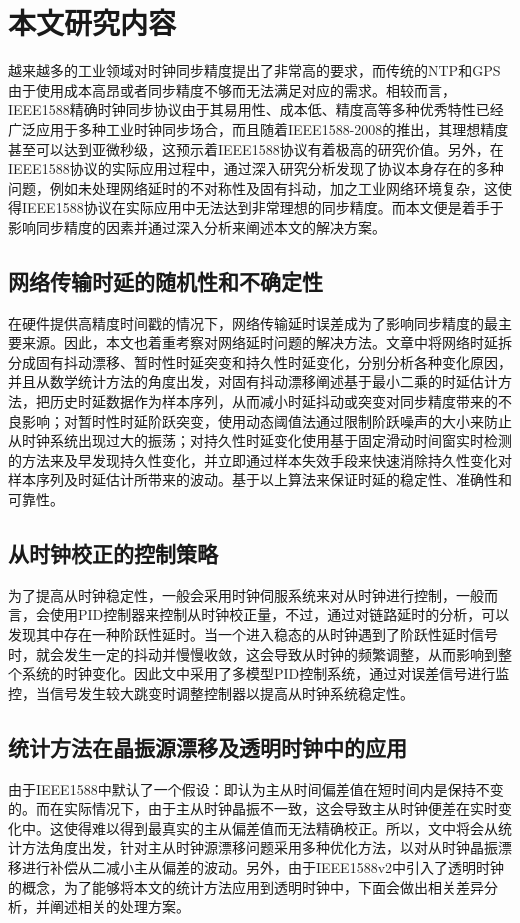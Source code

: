 \section{本文研究内容}
越来越多的工业领域对时钟同步精度提出了非常高的要求，而传统的NTP和GPS由于使用成本高昂或者同步精度不够而无法满足对应的需求。相较而言，IEEE1588精确时钟同步协议由于其易用性、成本低、精度高等多种优秀特性已经广泛应用于多种工业时钟同步场合，而且随着IEEE1588-2008的推出，其理想精度甚至可以达到亚微秒级，这预示着IEEE1588协议有着极高的研究价值。另外，在IEEE1588协议的实际应用过程中，通过深入研究分析发现了协议本身存在的多种问题，例如未处理网络延时的不对称性及固有抖动，加之工业网络环境复杂，这使得IEEE1588协议在实际应用中无法达到非常理想的同步精度。而本文便是着手于影响同步精度的因素并通过深入分析来阐述本文的解决方案。

\subsection{网络传输时延的随机性和不确定性}
在硬件提供高精度时间戳的情况下，网络传输延时误差成为了影响同步精度的最主要来源。因此，本文也着重考察对网络延时问题的解决方法。文章中将网络时延拆分成固有抖动漂移、暂时性时延突变和持久性时延变化，分别分析各种变化原因，并且从数学统计方法的角度出发，对固有抖动漂移阐述基于最小二乘的时延估计方法，把历史时延数据作为样本序列，从而减小时延抖动或突变对同步精度带来的不良影响；对暂时性时延阶跃突变，使用动态阈值法通过限制阶跃噪声的大小来防止从时钟系统出现过大的振荡；对持久性时延变化使用基于固定滑动时间窗实时检测的方法来及早发现持久性变化，并立即通过样本失效手段来快速消除持久性变化对样本序列及时延估计所带来的波动。基于以上算法来保证时延的稳定性、准确性和可靠性。

\subsection{从时钟校正的控制策略}
为了提高从时钟稳定性，一般会采用时钟伺服系统来对从时钟进行控制，一般而言，会使用PID控制器来控制从时钟校正量，不过，通过对链路延时的分析，可以发现其中存在一种阶跃性延时。当一个进入稳态的从时钟遇到了阶跃性延时信号时，就会发生一定的抖动并慢慢收敛，这会导致从时钟的频繁调整，从而影响到整个系统的时钟变化。因此文中采用了多模型PID控制系统，通过对误差信号进行监控，当信号发生较大跳变时调整控制器以提高从时钟系统稳定性。

\subsection{统计方法在晶振源漂移及透明时钟中的应用}
由于IEEE1588中默认了一个假设：即认为主从时间偏差值在短时间内是保持不变的。而在实际情况下，由于主从时钟晶振不一致，这会导致主从时钟便差在实时变化中。这使得难以得到最真实的主从偏差值而无法精确校正。所以，文中将会从统计方法角度出发，针对主从时钟源漂移问题采用多种优化方法，以对从时钟晶振漂移进行补偿从二减小主从偏差的波动。另外，由于IEEE1588v2中引入了透明时钟的概念，为了能够将本文的统计方法应用到透明时钟中，下面会做出相关差异分析，并阐述相关的处理方案。

